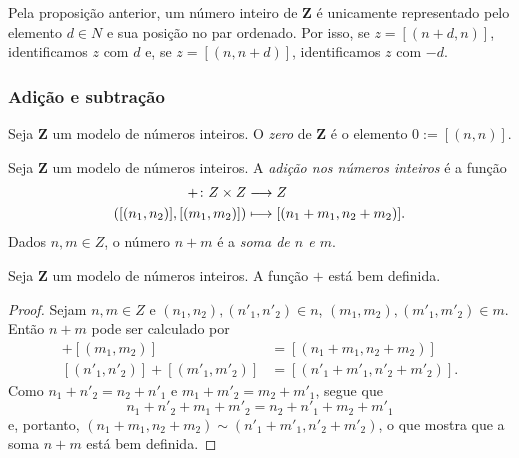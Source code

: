 	Pela proposição anterior, um número inteiro de $\bm Z$ é unicamente representado pelo elemento $d \in N$ e sua posição no par ordenado. Por isso, se $z=[(n+d,n)]$, identificamos $z$ com $d$ e, se $z=[(n,n+d)]$, identificamos $z$ com $-d$.


\subsubsection{Adição e subtração}

\begin{definition}
Seja $\bm Z$ um modelo de números inteiros. O \emph{zero} de $\bm Z$ é o elemento $0 := [(n,n)]$.
\end{definition}

\begin{definition}
Seja $\bm Z$ um modelo de números inteiros. A \emph{adição nos números inteiros} é a função
	\begin{align*}
	{+}\colon {Z \times Z} &\longrightarrow {Z} \\{([(n_1,n_2)],[(m_1,m_2)])} &\longmapsto [(n_1+m_1,n_2+m_2)].
	\end{align*}
Dados $n,m \in Z$, o número $n+m$ é a \emph{soma de $n$ e $m$}.
\end{definition}

\begin{theorem}
	Seja $\bm Z$ um modelo de números inteiros. A função $+$ está bem definida.
\end{theorem}
\begin{proof}
	Sejam $n,m \in Z$ e $(n_1,n_2),(n'_1,n'_2) \in n$, $(m_1,m_2),(m'_1,m'_2) \in m$. Então $n+m$ pode ser calculado por
	\begin{align*}
	[(n_1,n_2)]+[(m_1,m_2)] &= [(n_1+m_1,n_2+m_2)] \\
	[(n'_1,n'_2)]+[(m'_1,m'_2)] &= [(n'_1+m'_1,n'_2+m'_2)].
	\end{align*}
Como $n_1+n'_2=n_2+n'_1$ e $m_1+m'_2=m_2+m'_1$, segue que
	\begin{equation*}
	n_1+n'_2+m_1+m'_2=n_2+n'_1+m_2+m'_1
	\end{equation*}
e, portanto, $(n_1+m_1,n_2+m_2) \sim (n'_1+m'_1,n'_2+m'_2)$, o que mostra que a soma $n+m$ está bem definida.
\end{proof}

